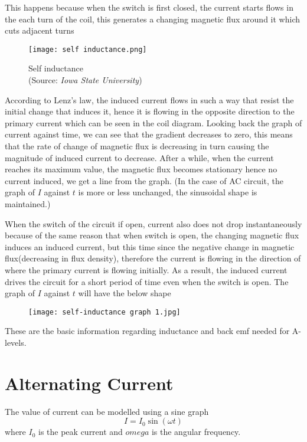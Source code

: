 \documentclass{article}
\begin{document}
This happens because when the switch is first closed, the current starts flows in the each turn of the coil, this generates a changing magnetic flux around it which cuts adjacent turns 

\begin{figure}[H]
    \centering
    \captionsetup{justification=centering,margin=2cm}
    \texttt{[image: self inductance.png]}
    \caption*{Self inductance \\ (Source: \textit{Iowa State University})}
\end{figure}

According to Lenz's law, the induced current flows in such a way that resist the initial change that induces it, hence it is flowing in the opposite direction to the primary current which can be seen in the coil diagram. Looking back the graph of current against time, we can see that the gradient decreases to zero, this means that the rate of change of magnetic flux is decreasing in turn causing the magnitude of induced current to decrease. After a while, when the current reaches its maximum value, the magnetic flux becomes stationary hence no current induced, we get a line from the graph. (In the case of AC circuit, the graph of $I$ against $t$ is more or less unchanged, the sinusoidal shape is maintained.)

When the switch of the circuit if open, current also does not drop instantaneously because of the same reason that when switch is open, the changing magnetic flux induces an induced current, but this time since the negative change in magnetic flux(decreasing in flux density), therefore the current is flowing in the direction of where the primary current is flowing initially. As a result, the induced current drives the circuit for a short period of time even when the switch is open. The graph of $I$ against $t$ will have the below shape

\begin{figure}[H]
    \centering
    \texttt{[image: self-inductance graph 1.jpg]}
\end{figure}

These are the basic information regarding inductance and back emf needed for A-levels.

\newpage
\section{Alternating Current}

The value of current can be modelled using a sine graph
$$I=I_0\sin (\omega t)$$
where $I_0$ is the peak current and $omega$ is the angular frequency.
\end{document}
